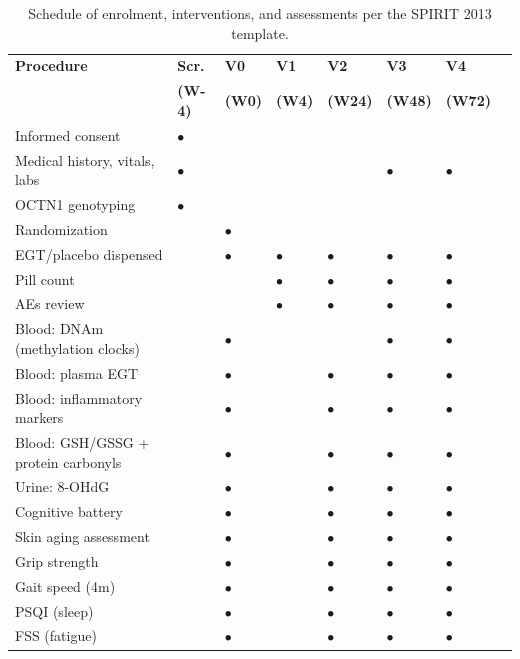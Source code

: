 \documentclass[11pt,a4paper]{article}
\begin{document}
\begin{table}[H]
\centering
\caption{Schedule of enrolment, interventions, and assessments per the SPIRIT 2013 template.}
\footnotesize
\begin{tabularx}{\textwidth}{l*{7}{X}}
\toprule
\textbf{Procedure} & \textbf{Scr.} & \textbf{V0} & \textbf{V1} & \textbf{V2} & \textbf{V3} & \textbf{V4} \\
& \textbf{(W-4)} & \textbf{(W0)} & \textbf{(W4)} & \textbf{(W24)} & \textbf{(W48)} & \textbf{(W72)} \\
\midrule
Informed consent & $\bullet$ & & & & & \\
Medical history, vitals, labs & $\bullet$ & & & & $\bullet$ & $\bullet$ \\
OCTN1 genotyping & $\bullet$ & & & & & \\
Randomization & & $\bullet$ & & & & \\
\hline
EGT/placebo dispensed & & $\bullet$ & $\bullet$ & $\bullet$ & $\bullet$ & $\bullet$ \\
Pill count & & & $\bullet$ & $\bullet$ & $\bullet$ & $\bullet$ \\
AEs review & & & $\bullet$ & $\bullet$ & $\bullet$ & $\bullet$ \\
\hline
Blood: DNAm (methylation clocks) & & $\bullet$ & & & $\bullet$ & $\bullet$ \\
Blood: plasma EGT & & $\bullet$ & & $\bullet$ & $\bullet$ & $\bullet$ \\
Blood: inflammatory markers & & $\bullet$ & & $\bullet$ & $\bullet$ & $\bullet$ \\
Blood: GSH/GSSG + protein carbonyls & & $\bullet$ & & $\bullet$ & $\bullet$ & $\bullet$ \\
Urine: 8-OHdG & & $\bullet$ & & $\bullet$ & $\bullet$ & $\bullet$ \\
\hline
Cognitive battery & & $\bullet$ & & $\bullet$ & $\bullet$ & $\bullet$ \\
Skin aging assessment & & $\bullet$ & & $\bullet$ & $\bullet$ & $\bullet$ \\
Grip strength & & $\bullet$ & & $\bullet$ & $\bullet$ & $\bullet$ \\
Gait speed (4m) & & $\bullet$ & & $\bullet$ & $\bullet$ & $\bullet$ \\
\hline
PSQI (sleep) & & $\bullet$ & & $\bullet$ & $\bullet$ & $\bullet$ \\
FSS (fatigue) & & $\bullet$ & & $\bullet$ & $\bullet$ & $\bullet$ \\
\bottomrule
\end{tabularx}
\end{table}
\end{document}
